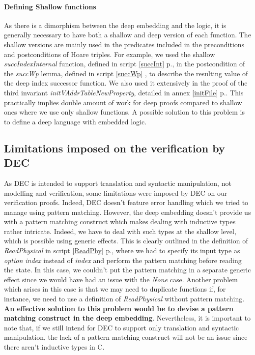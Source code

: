 \paragraph{Defining Shallow functions}
As there is a dimorphism  between the deep embedding and the logic, it is generally necessary to have both a shallow and deep version of each function. The shallow versions are mainly used in the predicates included in the preconditions and postconditions of Hoare triples. For example, we used the shallow \textit{succIndexInternal} function, defined in script \ref{succInt} p.\pageref{succInt}, in the postcondition of the \textit{succWp} lemma, defined in script \ref{succWp} \pageref{succWp}, to describe the resulting value of the deep index successor function. We also used it extensively in the proof of the third invariant \textit{initVAddrTableNewProperty}, detailed in annex \ref{initFile} p.\pageref{initFile}. This practically implies double amount of work for deep proofs compared to shallow ones where we use only shallow functions. A possible solution to this problem is to define a deep language with embedded logic\cite{SoftwareFoundation}. 

\subsection{Limitations imposed on the verification by DEC}
As DEC is intended to support translation and syntactic manipulation, not modelling and verification, some limitations were imposed by DEC on our verification proofs. Indeed, DEC doesn't feature error handling which we tried to manage using pattern matching. However, the deep embedding doesn't provide us with a pattern matching construct which makes dealing with inductive types rather intricate. Indeed, we have to deal with such types at the shallow level, which is possible using generic effects. This is clearly outlined in the definition of \textit{ReadPhysical} in script \ref{ReadPhy} p.\pageref{ReadPhy}, where we had to specify its input type as \textit{option index} instead of \textit{index} and perform the pattern matching before reading the state. In this case, we couldn't put the pattern matching in a separate generic effect since we would have had an issue with the \textit{None} case. Another problem which arises in this case is that we may need to duplicate functions if, for instance, we need to use a definition of \textit{ReadPhysical} without pattern matching. \textbf{An effective solution to this problem would be to devise a pattern matching construct in the deep embedding}. Nevertheless, it is important to note that, if we still intend for DEC to support only  translation and syntactic manipulation, the lack of a pattern matching construct will not be an issue since there aren't inductive types in C. 

